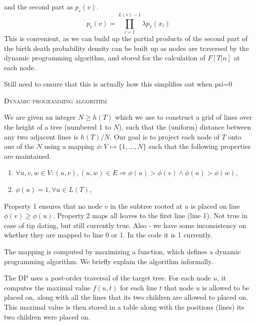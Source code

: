 \documentclass[12pt,letterpaper]{article}
\newcommand{\ejmcomment}[1]{{\color{green} #1}}
\renewcommand{\section}[1]{%
\bigskip
\begin{center}
\begin{Large}
\normalfont\scshape #1
\medskip
\end{Large}
\end{center}}
\begin{document}
and the second part as $p_c(v)$.
$$p_{c}(v) = \prod_{i=1}^{L(v)-1}\lambda p_1(x_i)$$
This is convenient, as we can build up the partial products of the second part of the birth death
probability density can be built up as nodes are traversed by
the dynamic programming algorithm, and stored for the calculation of $F[T|n]$ at each node.

\ejmcomment{Still need to ensure that this is actually how this simplifies out when psi=0}

\section{Dynamic programming algorithm}

We are given an integer $N \geq h(T)$ which we use to construct a grid of lines
over the height of a tree (numbered 1 to $N$), such that the (uniform) distance between any two
adjacent lines is $h(T) / N$.  Our goal is to project each node of $T$ onto one
of the $N$ using a mapping $\phi : V \mapsto \{1,\ldots,N\}$ such that the
following properties are maintained.

\begin{enumerate}
\item $\forall u,v,w \in V : (u,v), (u,w) \in E \Rightarrow \phi(u) > \phi(v) \wedge \phi(u) > \phi(w)$,
\item $\phi(u) = 1, \forall u \in L(T)$,
\end{enumerate}

Property 1 ensures that no node $v$ in the subtree rooted at $u$ is placed on
line $\phi(v) \geq \phi(u)$. Property 2 maps all leaves to the first line (line 1).
\ejmcomment{Not true in case of tip dating, but still currently true. 
Also - we have some inconsistency on whether they are mapped to line 0 or 1.
In the code it is 1 currently.}

The mapping is computed by maximizing a function, which defines a
dynamic programming algorithm.  We briefly explain the algorithm informally.

The DP uses a post-order traversal of the target tree. For each node $u$, it
computes the maximal value $f(u,t)$ for each line $t$ that node $u$ is allowed to be
placed on, along with all the lines that its two children are allowed to placed
on. This maximal value is then stored in a table along with the positions (lines) its
two children were placed on. 
\end{document}
